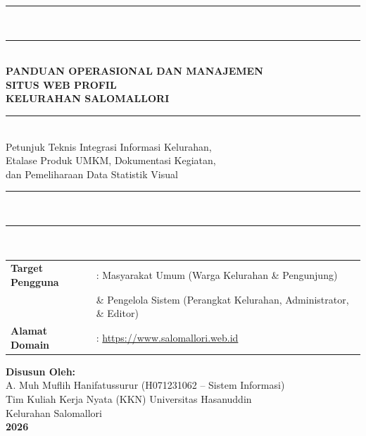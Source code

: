 \documentclass[12pt,a4paper]{report}
\begin{document}
\begin{titlepage}
\begin{center}

\vspace*{1cm}

{\color{midnight}\rule{\linewidth}{3pt}}\\[0.5cm]
{\color{gold}\rule{\linewidth}{1pt}}\\[1.2cm]

{\fontsize{20pt}{26pt}\selectfont\bfseries\color{midnight}
PANDUAN OPERASIONAL DAN MANAJEMEN\\ SITUS WEB PROFIL\\ KELURAHAN SALOMALLORI
}\\[0.8cm]

{\color{gold}\rule{0.4\linewidth}{1.5pt}}\\[0.8cm]

{\large\color{obsidian}
Petunjuk Teknis Integrasi Informasi Kelurahan,\\ Etalase Produk UMKM, Dokumentasi Kegiatan,\\ dan Pemeliharaan Data Statistik Visual
}\\[1.2cm]

{\color{midnight}\rule{\linewidth}{1pt}}\\[0.3cm]
{\color{midnight}\rule{\linewidth}{3pt}}\\[1.5cm]

\begin{tabular}{ll}
\textbf{Target Pengguna} & : Masyarakat Umum (Warga Kelurahan \& Pengunjung) \\
                        & \quad \& Pengelola Sistem (Perangkat Kelurahan, Administrator, \& Editor) \\
\textbf{Alamat Domain}   & : \url{https://www.salomallori.web.id} \\
\end{tabular}

\vfill

{\large\textbf{Disusun Oleh:}}\\
{\normalsize A. Muh Muflih Hanifatussurur (H071231062 -- Sistem Informasi)}\\
{\normalsize Tim Kuliah Kerja Nyata (KKN) Universitas Hasanuddin}\\
{\normalsize Kelurahan Salomallori}\\[0.5cm]

{\Large\textbf{2026}}

\end{center}
\end{titlepage}
\end{document}
